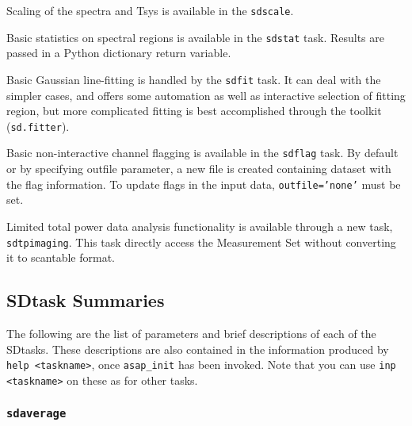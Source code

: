 Scaling of the spectra and Tsys is available in the {\tt sdscale}.

Basic statistics on spectral regions is available in the {\tt sdstat} task.
Results are passed in a Python dictionary return variable.

Basic Gaussian line-fitting is handled by the {\tt sdfit} task.  It can deal
with the simpler cases, and offers some automation as well as interactive 
selection of fitting region, but more complicated
fitting is best accomplished through the toolkit ({\tt sd.fitter}).

Basic non-interactive channel flagging is available in the {\tt sdflag} task.
By default or by specifying outfile parameter, a new file is created containing 
dataset with the flag information. To update flags in the input data,
{\tt outfile='none'} must be set.

Limited total power data analysis functionality is available through 
a new task, {\tt sdtpimaging}. This task directly access the Measurement
Set without converting it to scantable format.
\newpage 
\subsection{SDtask Summaries}
\label{section:sd.sdtasks.tasks}

The following are the list of parameters and
brief descriptions of each of the SDtasks.
These descriptions are also contained in the information produced
by {\tt help <taskname>}, once {\tt asap\_init} has been invoked.
Note that you can use {\tt inp <taskname>} on these as for other tasks.

\subsubsection{{\tt sdaverage}}
\label{section:sd.sdtasks.tasks.sdaverage}

